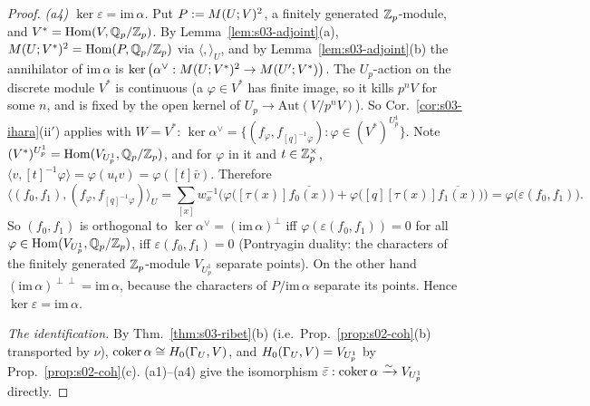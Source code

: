\begin{proof}
\emph{(a4) $\ker\varepsilon=\mathrm{im}\,\alpha$.} Put $P:=M(U;V)^2$, a finitely generated $\mathbb{Z}_p$-module, and $V^*=\operatorname{Hom}(V,\mathbb{Q}_p/\mathbb{Z}_p)$. By
Lemma~\ref{lem:s03-adjoint}(a), $M(U;V^*)^2=\operatorname{Hom}(P,\mathbb{Q}_p/\mathbb{Z}_p)$ via $\langle,\rangle_U$, and by Lemma~\ref{lem:s03-adjoint}(b) the annihilator of
$\mathrm{im}\,\alpha$ is $\ker\big(\alpha^\vee:M(U;V^*)^2\to M(U';V^*)\big)$. The $U_p$-action on the discrete module $V^*$ is continuous (a
$\varphi\in V^*$ has finite image, so it kills $p^nV$ for some $n$, and is fixed by the open kernel of $U_p\to\mathrm{Aut}(V/p^nV)$). So
Cor.~\ref{cor:s03-ihara}(ii$'$) applies with $W=V^*$:
$\ker\alpha^\vee=\{(f_\varphi,f_{[q]^{-1}\varphi}):\varphi\in(V^*)^{U^1_p}\}$. Note $(V^*)^{U^1_p}=\operatorname{Hom}(V_{U^1_p},\mathbb{Q}_p/\mathbb{Z}_p)$, and for $\varphi$ in it and $t\in\mathbb{Z}_p^\times$,
$\langle v,[t]^{-1}\varphi\rangle=\varphi(u_tv)=\varphi([t]\bar v)$. Therefore
\[\big\langle(f_0,f_1),(f_\varphi,f_{[q]^{-1}\varphi})\big\rangle_U=\sum_{[x]}w_x^{-1}\Big(\varphi\big([\tau(x)]\overline{f_0(x)}\big)+\varphi\big([q][\tau(x)]\overline{f_1(x)}\big)\Big)=\varphi\big(\varepsilon(f_0,f_1)\big).\]
So $(f_0,f_1)$ is orthogonal to $\ker\alpha^\vee=(\mathrm{im}\,\alpha)^\perp$ iff $\varphi(\varepsilon(f_0,f_1))=0$ for all $\varphi\in\operatorname{Hom}(V_{U^1_p},\mathbb{Q}_p/\mathbb{Z}_p)$, iff
$\varepsilon(f_0,f_1)=0$ (Pontryagin duality: the characters of the finitely generated $\mathbb{Z}_p$-module $V_{U^1_p}$ separate points). On the other hand
$(\mathrm{im}\,\alpha)^{\perp\perp}=\mathrm{im}\,\alpha$, because the characters of $P/\mathrm{im}\,\alpha$ separate its points. Hence $\ker\varepsilon=\mathrm{im}\,\alpha$.

\emph{The identification.} By Thm.~\ref{thm:s03-ribet}(b) (i.e.\ Prop.~\ref{prop:s02-coh}(b) transported by $\nu$), $\operatorname{coker}\alpha\cong H_0(\Gamma_U,V)$, and
$H_0(\Gamma_U,V)=V_{U^1_p}$ by Prop.~\ref{prop:s02-coh}(c). (a1)--(a4) give the isomorphism $\bar\varepsilon:\operatorname{coker}\alpha\xrightarrow\sim V_{U^1_p}$ directly.


\end{proof}
